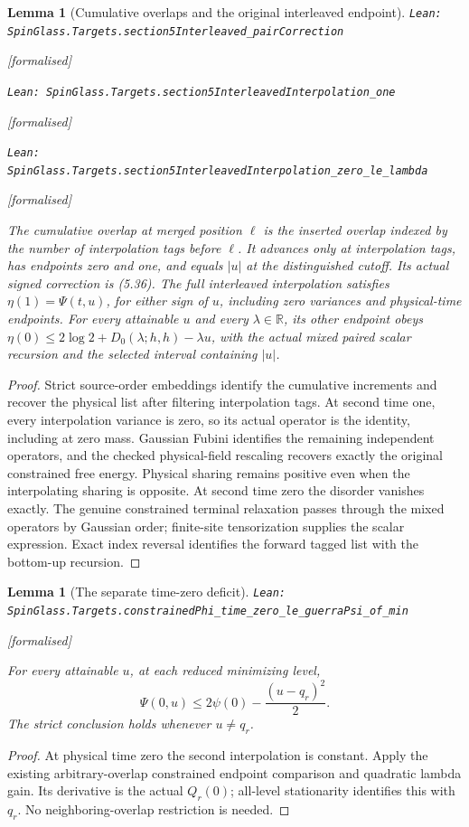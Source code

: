 \documentclass[11pt]{article}
\providecommand{\lean}[1]{\leavevmode\par\nopagebreak
  {\noindent\normalfont\footnotesize\raggedright\texttt{Lean: #1}\par}\nopagebreak}
\providecommand{\leanok}{\par\nopagebreak
  {\noindent\normalfont\footnotesize\textcolor{green!50!black}{[formalised]}\par}\nopagebreak}
\newtheorem{lemma}[theorem]{Lemma}
\newcommand{\R}{\mathbb{R}}
\begin{document}
\begin{lemma}[Cumulative overlaps and the original interleaved endpoint]
\lean{SpinGlass.Targets.section5Interleaved\_pairCorrection}\leanok
\lean{SpinGlass.Targets.section5InterleavedInterpolation\_one}\leanok
\lean{SpinGlass.Targets.section5InterleavedInterpolation\_zero\_le\_lambda}\leanok
The cumulative overlap at merged position $\ell$ is the inserted overlap
indexed by the number of interpolation tags before $\ell$. It advances
only at interpolation tags, has endpoints zero and one, and equals $|u|$
at the distinguished cutoff. Its actual signed correction is (5.36).
The full interleaved interpolation satisfies $\eta(1)=\Psi(t,u)$, for
either sign of $u$, including zero variances and physical-time endpoints.
For every attainable $u$ and every $\lambda\in\R$, its other endpoint obeys
$\eta(0)\le2\log2+D_0(\lambda;h,h)-\lambda u$, with the actual mixed
paired scalar recursion and the selected interval containing $|u|$.
\end{lemma}
\begin{proof}
Strict source-order embeddings identify the cumulative increments and
recover the physical list after filtering interpolation tags. At second
time one, every interpolation variance is zero, so its actual operator is
the identity, including at zero mass. Gaussian Fubini identifies the
remaining independent operators, and the checked physical-field rescaling
recovers exactly the original constrained free energy. Physical sharing
remains positive even when the interpolating sharing is opposite.
At second time zero the disorder vanishes exactly. The genuine constrained
terminal relaxation passes through the mixed operators by Gaussian order;
finite-site tensorization supplies the scalar expression. Exact index
reversal identifies the forward tagged list with the bottom-up recursion.
\end{proof}

\begin{lemma}[The separate time-zero deficit]
\lean{SpinGlass.Targets.constrainedPhi\_time\_zero\_le\_guerraPsi\_of\_min}\leanok
For every attainable $u$, at each reduced minimizing level,
\[
 \Psi(0,u)\le2\psi(0)-\frac{(u-q_r)^2}{2}.
\]
The strict conclusion holds whenever $u\ne q_r$.
\end{lemma}
\begin{proof}
At physical time zero the second interpolation is constant. Apply the
existing arbitrary-overlap constrained endpoint comparison and quadratic
lambda gain. Its derivative is the actual $Q_r(0)$; all-level stationarity
identifies this with $q_r$. No neighboring-overlap restriction is needed.
\end{proof}
\end{document}

